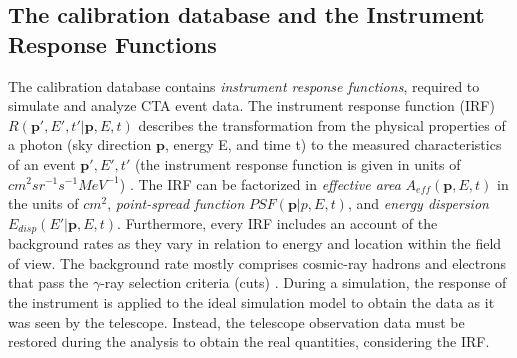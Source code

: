 \subsection{The calibration database and the Instrument Response Functions}
\label{ss:caldb}
The calibration database contains \textit{instrument response functions}, required to simulate and analyze CTA event data. The instrument response function (IRF) $R(\bm{p}',E',t'|\bm{p}, E, t)$ describes the transformation from the physical properties of a photon (sky direction $\bm{p}$, energy E, and time t) to the measured characteristics of an event $\bm{p'},E',t'$ (the instrument response function is given in units of $cm^2 sr^{-1} s^{-1} MeV^{-1}$) \cite{Knodlseder_2016}. 
The IRF can be factorized in \textit{effective area} $A_{eff}(\bm{p},E,t)$ in the units of $cm^2$, \textit{point-spread function} $PSF(\bm{p}|p,E,t)$, and \textit{energy dispersion} $E_{disp}(E'|\bm{p},E,t)$. Furthermore, every IRF includes an account of the background rates as they vary in relation to energy and location within the field of view. The background rate mostly comprises cosmic-ray hadrons and electrons that pass the $\gamma$-ray selection criteria (cuts) \cite{di2020detection}. During a simulation, the response of the instrument is applied to the ideal simulation model  to obtain the data as it was seen by the telescope. Instead, the telescope observation data must be restored during the analysis to obtain the real quantities, considering the IRF.


